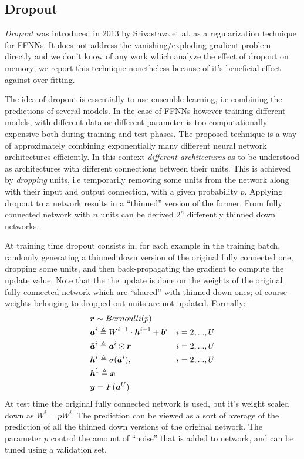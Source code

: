 \subsection{Dropout} 

\textit{Dropout} was introduced in 2013 by Srivastava et al. \cite{dropout} as a regularization technique for FFNNs. It does not address the vanishing/exploding gradient problem directly and we don't know of any work which analyze the effect of dropout on memory; we report this technique nonetheless because of it's beneficial effect against over-fitting.

The idea of dropout is essentially to use ensemble learning, i.e combining the predictions of several models. In the case of FFNNs however training different models, with different data or different parameter is too computationally expensive both during training and test phases.
The proposed technique is a way of approximately combining exponentially many different neural network architectures efficiently. In this context \textit{different architectures} as to be understood as architectures with different connections between their units. This is achieved by \textit{dropping} units, i.e temporarily removing some units from the network along with their input and output connection, with a given probability $p$. Applying dropout to a network results in a ``thinned'' version of the former. From fully connected network with $n$ units can be derived $2^n$ differently thinned down networks.

At training time dropout consists in, for each example in the training batch, randomly generating a thinned down version of the original fully connected one, dropping some units, and then back-propagating the gradient to compute the update value. Note that the the update is done on the weights of the original fully connected network which are ``shared'' with thinned down ones; of course weights belonging to dropped-out units are not updated. Formally:
\begin{align}
&\boldsymbol{r} \sim Bernoulli(p)&\\
&\boldsymbol{a}^{i} \triangleq W^{i-1} \cdot \boldsymbol{h}^{i-1} +\boldsymbol{b}^i  & i=2,...,U\\
&\tilde{\boldsymbol{a}}^{i} \triangleq \boldsymbol{a}^i \odot \boldsymbol{r} & i=2,...,U\\
&\boldsymbol{h}^{i} \triangleq \sigma(\tilde{\boldsymbol{a}}^{i}), & i=2,...,U\\
&\boldsymbol{h}^{1} \triangleq \boldsymbol{x} &\\
&\boldsymbol{y}=F(\boldsymbol{a}^{U}) &
\end{align}
At test time the original fully connected network is used, but it's weight scaled down as $W^{i} = pW^{i}$. The prediction can be viewed as a sort of average of the prediction of all the thinned down versions of the original network. The parameter $p$ control the amount of ``noise'' that is added to network, and can be tuned using a validation set.

